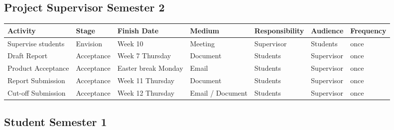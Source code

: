 	\vspace{6mm}
	
	\subsection{Project Supervisor Semester 2}
	
	\begin{center}
	
		\begin{tabular}{ | >{\scriptsize}p{35mm} | >{\scriptsize}p{15mm} | >{\scriptsize}p{25mm} | >{\scriptsize}p{15mm} | >{\scriptsize}p{25mm} | >{\scriptsize}p{15mm} | >{\scriptsize}p{15mm} |}
			\hline

			\textbf{Activity} 		& \textbf{Stage} 	& \textbf{Finish Date} 	& \textbf{Medium} 	& \textbf{Responsibility} 	& \textbf{Audience} 		& \textbf{Frequency} 	\\ \hline
			Supervise students	 	& Envision	 		& Week 10 				& Meeting		 	& Supervisor 				& Students				 	& once 					\\ \hline
			\rowcolor[gray]{.98}
			Draft Report 			& Acceptance 		& Week 7 Thursday 		& Document 			& Students 					& Supervisor 				& once 					\\ \hline
			Product Acceptance 		& Acceptance 		& Easter break Monday 	& Email 			& Students 					& Supervisor				& once 					\\ \hline
			\rowcolor[gray]{.98}
			Report Submission 		& Acceptance 		& Week 11 Thursday 		& Document 			& Students 					& Supervisor				& once 					\\ \hline
			Cut-off Submission 		& Acceptance 		& Week 12 Thursday 		& Email / Document	& Students 					& Supervisor				& once 					\\ \hline
	
		\end{tabular}
		
	\end{center}
	
	\vspace{6mm}
	
	
	\subsection{Student Semester 1}
	

